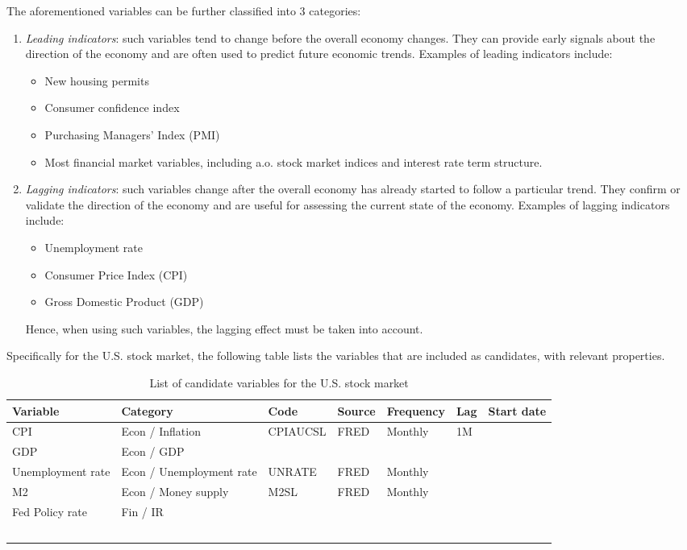 The aforementioned variables can be further classified into 3 categories: 
\begin{enumerate}
	\item \textit{Leading indicators}: such variables tend to change before the overall economy changes. They can provide early signals about the direction of the economy and are often used to predict future economic trends. Examples of leading indicators include:
	\begin{itemize}
		\item New housing permits
		\item Consumer confidence index
		\item Purchasing Managers' Index (PMI)
		\item Most financial market variables, including a.o. stock market indices and interest rate term structure. 
	\end{itemize}
	\item \textit{Lagging indicators}: such variables change after the overall economy has already started to follow a particular trend. They confirm or validate the direction of the economy and are useful for assessing the current state of the economy. Examples of lagging indicators include:
	\begin{itemize}
		\item Unemployment rate
		\item Consumer Price Index (CPI)
		\item Gross Domestic Product (GDP)
	\end{itemize}
	Hence, when using such variables, the lagging effect must be taken into account. 
\end{enumerate}

Specifically for the U.S. stock market, the following table lists the  variables that are included as candidates, with relevant properties. 

\begin{table}[!ht]
	\begin{spacing}{1.5}
	\centering
	\begin{tabular}{l|l|l|l|l|l|l}
		\hline
		\textbf{Variable} & \textbf{Category} & \textbf{Code} & \textbf{Source} & \textbf{Frequency} & \textbf{Lag} & \textbf{Start date} \\ \hline
		CPI & Econ / Inflation & CPIAUCSL & FRED & Monthly & 1M & ~ \\ \hline
		GDP & Econ / GDP & ~ & ~ & ~ & ~ & ~ \\ \hline
		Unemployment rate & Econ / Unemployment rate & UNRATE & FRED & Monthly & ~ & ~ \\ \hline
		M2 & Econ / Money supply & M2SL & FRED & Monthly & ~ & ~ \\ \hline
		Fed Policy rate & Fin / IR & ~ & ~ & ~ & ~ & ~ \\ \hline
		~ & ~ & ~ & ~ & ~ & ~ & ~ \\ \hline
	\end{tabular}
	\caption{List of candidate variables for the U.S. stock market}
	\label{tab:logit-US-candidate}
	\end{spacing}
\end{table}



